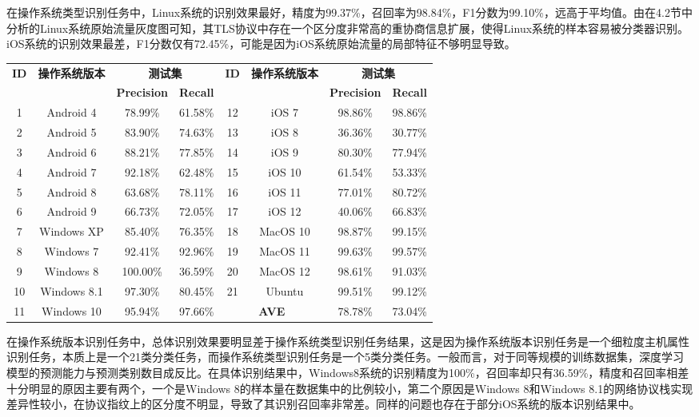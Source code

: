 在操作系统类型识别任务中，Linux系统的识别效果最好，精度为99.37\%，召回率为98.84\%，F1分数为99.10\%，远高于平均值。由在4.2节中分析的Linux系统原始流量灰度图可知，其TLS协议中存在一个区分度非常高的重协商信息扩展，使得Linux系统的样本容易被分类器识别。iOS系统的识别效果最差，F1分数仅有72.45\%，可能是因为iOS系统原始流量的局部特征不够明显导致。

\begin{table}[!h]
    \centering
    \footnotesize
    \setlength{\tabcolsep}{8pt}
    \renewcommand{\arraystretch}{1}
\begin{tabular}{|c|c|c|c|c|c|c|c|}
\hline
\multirow{2}{*}{\textbf{ID}} & \multirow{2}{*}{\textbf{操作系统版本}}  & \multicolumn{2}{c|}{\textbf{测试集}} & \multirow{2}{*}{\textbf{ID}} & \multirow{2}{*}{\textbf{操作系统版本}}  & \multicolumn{2}{c|}{\textbf{测试集}} \\ \cline{3-4} \cline{7-8}
 &  & \textbf{Precision} & \textbf{Recall}  & & & \textbf{Precision} & \textbf{Recall} \\ \hline
1 & Android 4 & 78.99\% & 61.58\% &12 & iOS 7 & 98.86\% & 98.86\% \\ \hline
2 & Android 5 & 83.90\% & 74.63\% &13 & iOS 8 & 36.36\% & 30.77\% \\ \hline
3 & Android 6 & 88.21\% & 77.85\% &14 & iOS 9 & 80.30\% & 77.94\% \\ \hline
4 & Android 7 & 92.18\% & 62.48\% &15 & iOS 10 & 61.54\% & 53.33\% \\ \hline
5 & Android 8 & 63.68\% & 78.11\% &16 & iOS 11 & 77.01\% & 80.72\% \\ \hline
6 & Android 9 & 66.73\% & 72.05\% &17 & iOS 12 & 40.06\% & 66.83\% \\ \hline
7 & Windows XP & 85.40\% & 76.35\% &18 & MacOS 10 & 98.87\% & 99.15\% \\ \hline
8 & Windows 7 & 92.41\% & 92.96\% &19 & MacOS 11 & 99.63\% & 99.57\% \\ \hline
9 & Windows 8 & 100.00\% & 36.59\% &20 & MacOS 12 & 98.61\% & 91.03\% \\ \hline
10 & Windows 8.1 & 97.30\% & 80.45\% &21 & Ubuntu & 99.51\% & 99.12\% \\ \hline
11 & Windows 10 & 95.94\% & 97.66\% & \multicolumn{2}{c|}{\textbf{AVE}}& 78.78\% & 73.04\% \\ \hline
\end{tabular}
\end{table}

在操作系统版本识别任务中，总体识别效果要明显差于操作系统类型识别任务结果，这是因为操作系统版本识别任务是一个细粒度主机属性识别任务，本质上是一个21类分类任务，而操作系统类型识别任务是一个5类分类任务。一般而言，对于同等规模的训练数据集，深度学习模型的预测能力与预测类别数目成反比。在具体识别结果中，Windows8系统的识别精度为100\%，召回率却只有36.59\%，精度和召回率相差十分明显的原因主要有两个，一个是Windows 8的样本量在数据集中的比例较小，第二个原因是Windows 8和Windows 8.1的网络协议栈实现差异性较小，在协议指纹上的区分度不明显，导致了其识别召回率非常差。同样的问题也存在于部分iOS系统的版本识别结果中。

